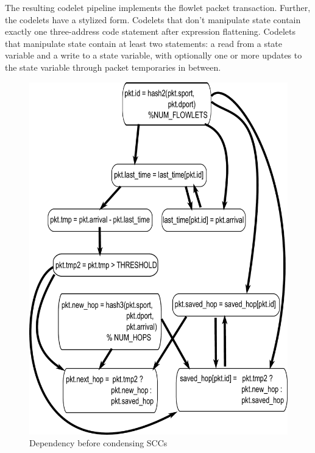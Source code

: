 
The resulting codelet pipeline implements the flowlet packet transaction.
Further, the codelets have a stylized form.  Codelets that don't manipulate
state contain exactly one three-address code statement after expression
flattening. Codelets that manipulate state contain at least two statements: a
read from a state variable and a write to a state variable, with optionally one
or more updates to the state variable through packet temporaries in between.

\begin{figure}[!t]
\begin{minipage}{0.5\textwidth}
  \includegraphics[width=\columnwidth]{deps.pdf}
  \caption{Dependency before condensing SCCs}
  \label{fig:partitioning_before}

\end{minipage}
\end{figure}
